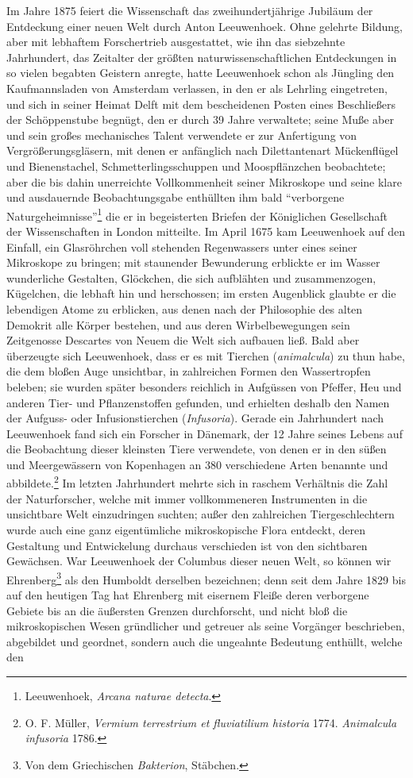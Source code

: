 \documentclass[a4paper, 11pt, oneside, english]{article}
\begin{document}
Im Jahre 1875 feiert die Wissenschaft das zweihundertjährige Jubiläum der Entdeckung einer neuen Welt durch Anton Leeuwenhoek. Ohne gelehrte Bildung, aber mit lebhaftem Forschertrieb ausgestattet, wie ihn das siebzehnte Jahrhundert, das Zeitalter der größten naturwissenschaftlichen Entdeckungen in so vielen begabten Geistern anregte, hatte Leeuwenhoek schon als Jüngling den Kaufmannsladen von Amsterdam verlassen, in den er als Lehrling eingetreten, und sich in seiner Heimat Delft mit dem bescheidenen Posten eines Beschließers der Schöppenstube begnügt, den er durch 39 Jahre verwaltete; seine Muße aber und sein großes mechanisches Talent verwendete er zur Anfertigung von Vergrößerungsgläsern, mit denen er anfänglich nach Dilettantenart Mückenflügel und Bienenstachel, Schmetterlingsschuppen und Moospflänzchen beobachtete; aber die bis dahin unerreichte Vollkommenheit seiner Mikroskope und seine klare und ausdauernde Beobachtungsgabe enthüllten ihm bald "`verborgene Naturgeheimnisse"'\footnote{Leeuwenhoek, \emph{Arcana naturae detecta}.} die er in begeisterten Briefen der Königlichen Gesellschaft der Wissenschaften in London mitteilte. Im April 1675 kam Leeuwenhoek auf den Einfall, ein Glasröhrchen voll stehenden Regenwassers unter eines seiner Mikroskope zu bringen; mit staunender Bewunderung erblickte er im Wasser wunderliche Gestalten, Glöckchen, die sich aufblähten und zusammenzogen, Kügelchen, die lebhaft hin und herschossen; im ersten Augenblick glaubte er die lebendigen Atome zu erblicken, aus denen nach der Philosophie des alten Demokrit alle Körper bestehen, und aus deren Wirbelbewegungen sein Zeitgenosse Descartes von Neuem die Welt sich aufbauen ließ. Bald aber überzeugte sich Leeuwenhoek, dass er es mit Tierchen (\emph{animalcula}) zu thun habe, die dem bloßen Auge unsichtbar, in zahlreichen Formen den Wassertropfen beleben; sie wurden später besonders reichlich in Aufgüssen von Pfeffer, Heu und anderen Tier- und Pflanzenstoffen gefunden, und erhielten deshalb den Namen der Aufguss- oder Infusionstierchen (\emph{Infusoria}). Gerade ein Jahrhundert nach Leeuwenhoek fand sich ein Forscher in Dänemark, der 12 Jahre seines Lebens auf die Beobachtung dieser kleinsten Tiere verwendete, von denen er in den süßen und Meergewässern von Kopenhagen an 380 verschiedene Arten benannte und abbildete.\footnote{O. F. Müller, \emph{Vermium terrestrium et fluviatilium historia} 1774. \emph{Animalcula infusoria} 1786.} Im letzten Jahrhundert mehrte sich in raschem Verhältnis die Zahl der Naturforscher, welche mit immer vollkommeneren Instrumenten in die unsichtbare Welt einzudringen suchten; außer den zahlreichen Tiergeschlechtern wurde auch eine ganz eigentümliche mikroskopische Flora entdeckt, deren Gestaltung und Entwickelung durchaus verschieden ist von den sichtbaren Gewächsen. War Leeuwenhoek der Columbus dieser neuen Welt, so können wir Ehrenberg\footnote{Von dem Griechischen \emph{Bakterion}, Stäbchen.} als den Humboldt derselben bezeichnen; denn seit dem Jahre 1829 bis auf den heutigen Tag hat Ehrenberg mit eisernem Fleiße deren verborgene Gebiete bis an die äußersten Grenzen durchforscht, und nicht bloß die mikroskopischen Wesen gründlicher und getreuer als seine Vorgänger beschrieben, abgebildet und geordnet, sondern auch die ungeahnte Bedeutung enthüllt, welche den 
\end{document}
